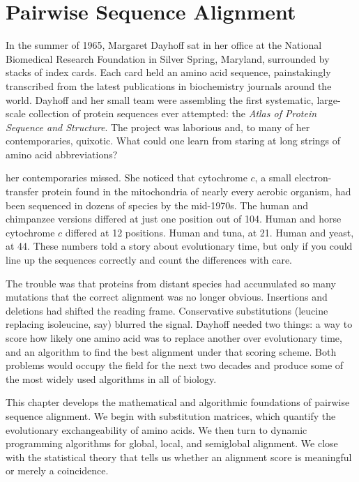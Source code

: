 \chapter{Pairwise Sequence Alignment}
\label{ch:pairwise-alignment}

In the summer of 1965, Margaret Dayhoff sat in her office at the National Biomedical Research Foundation in Silver Spring, Maryland, surrounded by stacks of index cards. Each card held an amino acid sequence, painstakingly transcribed from the latest publications in biochemistry journals around the world. Dayhoff and her small team were assembling the first systematic, large-scale collection of protein sequences ever attempted: the \textit{Atlas of Protein Sequence and Structure}. The project was laborious and, to many of her contemporaries, quixotic. What could one learn from staring at long strings of amino acid abbreviations?

 her contemporaries missed. She noticed that cytochrome $c$, a small electron-transfer protein found in the mitochondria of nearly every aerobic organism, had been sequenced in dozens of species by the mid-1970s. The human and chimpanzee versions differed at just one position out of 104. Human and horse cytochrome $c$ differed at 12 positions. Human and tuna, at 21. Human and yeast, at 44. These numbers told a story about evolutionary time, but only if you could line up the sequences correctly and count the differences with care.

The trouble was that proteins from distant species had accumulated so many mutations that the correct alignment was no longer obvious. Insertions and deletions had shifted the reading frame. Conservative substitutions (leucine replacing isoleucine, say) blurred the signal. Dayhoff needed two things: a way to score how likely one amino acid was to replace another over evolutionary time, and an algorithm to find the best alignment under that scoring scheme. Both problems would occupy the field for the next two decades and produce some of the most widely used algorithms in all of biology.

This chapter develops the mathematical and algorithmic foundations of pairwise sequence alignment. We begin with substitution matrices, which quantify the evolutionary exchangeability of amino acids. We then turn to dynamic programming algorithms for global, local, and semiglobal alignment. We close with the statistical theory that tells us whether an alignment score is meaningful or merely a coincidence.


